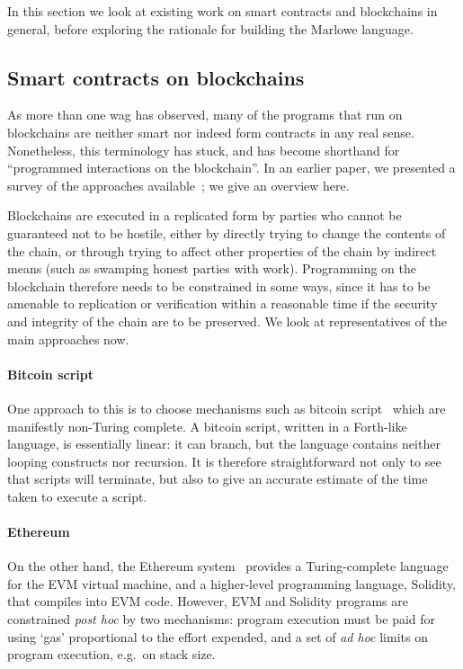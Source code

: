 \documentclass[
      acmsmall
    , screen
  ]{acmart}
\begin{document}
\medskip
\noindent
In this section we look at existing work on smart contracts and blockchains in general, before exploring the rationale for building the Marlowe language.

\subsection{Smart contracts on blockchains}

As more than one wag has observed, many of the programs that run on blockchains are neither smart nor indeed form 
contracts in any real sense. Nonetheless, this terminology has stuck, and has become shorthand for ``programmed 
interactions on the blockchain''. In an earlier paper, we presented a survey of the approaches 
available~\cite{cryptoeprint:2016:1156}; we give an overview here.

Blockchains are executed in a replicated form by parties who cannot be guaranteed not to be hostile, either by directly trying to change the contents of the chain, or through trying to affect other properties of the chain by indirect means (such as swamping honest parties with work). Programming on the blockchain therefore needs to be constrained in some ways, since it has to be amenable to replication or verification within a reasonable time if the security and integrity of the chain are to be preserved. We look at representatives of the main approaches now.

\paragraph{Bitcoin script}

One approach to this is to choose mechanisms such as bitcoin script~\cite{BitcoinWikiScript} which are manifestly 
non-Turing complete. A bitcoin script, written in a Forth-like language, is essentially linear: it can branch, but the 
language contains neither looping constructs nor recursion. It is therefore straightforward not only to see that scripts 
will terminate, but also to give an accurate estimate of the time taken to execute a script. 

\paragraph{Ethereum}

On the other hand, the Ethereum system~\cite{wood2014ethereum} provides a Turing-complete language for the EVM virtual 
machine, and a higher-level programming language, Solidity, that compiles into EVM code. However, EVM and Solidity 
programs are constrained \emph{post hoc} by two mechanisms: program execution must be paid for using `gas' proportional 
to the effort expended, and a set of \emph{ad hoc} limits on program execution, e.g.\ on stack size.
\end{document}
